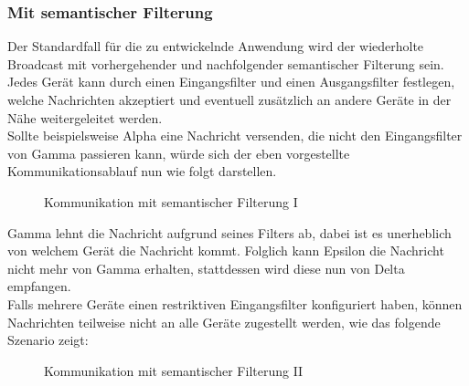 \subsubsection{Mit semantischer Filterung}
Der Standardfall für die zu entwickelnde Anwendung wird der wiederholte Broadcast mit vorhergehender und nachfolgender semantischer Filterung sein. Jedes Gerät kann durch einen Eingangsfilter und einen Ausgangsfilter festlegen, welche Nachrichten akzeptiert und eventuell zusätzlich an andere Geräte in der Nähe weitergeleitet werden. 
\\Sollte beispielsweise Alpha eine Nachricht versenden, die nicht den Eingangsfilter von Gamma passieren kann, würde sich der eben vorgestellte Kommunikationsablauf nun wie folgt darstellen.
\begin{figure}[H]
	\centering
	\caption{Kommunikation mit semantischer Filterung I}
	\label{fig:beispielszenario2}
\end{figure}
Gamma lehnt die Nachricht aufgrund seines Filters ab, dabei ist es unerheblich von welchem Gerät die Nachricht kommt. Folglich kann Epsilon die Nachricht nicht mehr von Gamma erhalten, stattdessen wird diese nun von Delta empfangen. 
\\Falls mehrere Geräte einen restriktiven Eingangsfilter konfiguriert haben, können Nachrichten teilweise nicht an alle Geräte zugestellt werden, wie das folgende Szenario zeigt:\\
\begin{figure}[H]
	\centering
	\caption{Kommunikation mit semantischer Filterung II}
	\label{fig:beispielszenario3}
\end{figure}
